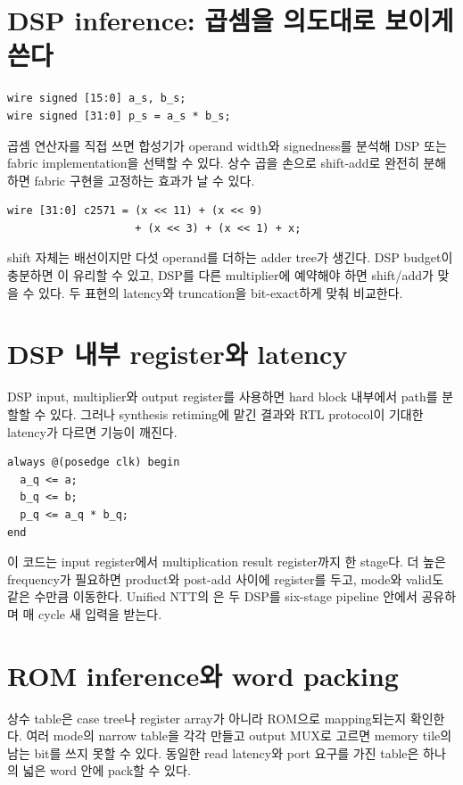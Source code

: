 \section{DSP inference: 곱셈을 의도대로 보이게 쓴다}

\begin{lstlisting}
wire signed [15:0] a_s, b_s;
wire signed [31:0] p_s = a_s * b_s;
\end{lstlisting}

곱셈 연산자를 직접 쓰면 합성기가 operand width와 signedness를 분석해 DSP 또는
fabric implementation을 선택할 수 있다. 상수 곱을 손으로 shift-add로 완전히
분해하면 fabric 구현을 고정하는 효과가 날 수 있다.

\begin{lstlisting}
wire [31:0] c2571 = (x << 11) + (x << 9)
                    + (x << 3) + (x << 1) + x;
\end{lstlisting}

shift 자체는 배선이지만 다섯 operand를 더하는 adder tree가 생긴다. DSP budget이
충분하면 이 유리할 수 있고, DSP를 다른 multiplier에 예약해야
하면 shift/add가 맞을 수 있다. 두 표현의 latency와 truncation을 bit-exact하게
맞춰 비교한다.

\section{DSP 내부 register와 latency}

DSP input, multiplier와 output register를 사용하면 hard block 내부에서 path를
분할할 수 있다. 그러나 synthesis retiming에 맡긴 결과와 RTL protocol이 기대한
latency가 다르면 기능이 깨진다.

\begin{lstlisting}
always @(posedge clk) begin
  a_q <= a;
  b_q <= b;
  p_q <= a_q * b_q;
end
\end{lstlisting}

이 코드는 input register에서 multiplication result register까지 한 stage다.
더 높은 frequency가 필요하면 product와 post-add 사이에 register를 두고, mode와
valid도 같은 수만큼 이동한다. Unified NTT의 은 두 DSP를
six-stage pipeline 안에서 공유하며 매 cycle 새 입력을 받는다.

\section{ROM inference와 word packing}

상수 table은 case tree나 register array가 아니라 ROM으로 mapping되는지 확인한다.
여러 mode의 narrow table을 각각 만들고 output MUX로 고르면 memory tile의 남는
bit를 쓰지 못할 수 있다. 동일한 read latency와 port 요구를 가진 table은 하나의
넓은 word 안에 pack할 수 있다.

